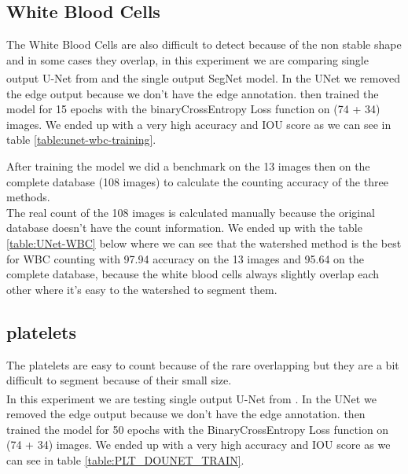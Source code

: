 \subsection{White Blood Cells}
\hspace{\parindent}
The White Blood Cells are also difficult to detect because of the non stable shape and in some cases they overlap, in this experiment we are comparing single output U-Net from \textsuperscript{\cite{10.1007/978-3-030-44584-3_31}} and the single output SegNet model.
In the UNet we removed the edge output because we don't have the edge annotation. then trained the model for 15 epochs with the binaryCrossEntropy Loss function on (74 + 34) images. 
We ended up with a very high accuracy and IOU score as we can see in table \ref{table:unet-wbc-training}.



After training the model we did a benchmark on the 13 images then on the complete database (108 images) to calculate the counting accuracy of the three methods.\\ 
The real count of the 108 images is calculated manually because the original database doesn't have the count information. We ended up with the table \ref{table:UNet-WBC} below where we can see that the watershed method is the best for WBC counting with 97.94 accuracy on the 13 images and 95.64 on the complete database, because the white blood cells always slightly overlap each other where it's easy to the watershed to segment them.



\subsection{platelets}
\hspace{\parindent}
The platelets are easy to count because of the rare overlapping but they are a bit difficult to segment because of their small size.\\
In this experiment we are testing single output U-Net from \textsuperscript{\cite{10.1007/978-3-030-44584-3_31}}. In the UNet we removed the edge output because we don’t have the edge annotation.
then trained the model for 50 epochs with the BinaryCrossEntropy Loss function on (74 + 34) images.
We ended up with a very high accuracy and IOU score as we can see in table \ref{table:PLT_DOUNET_TRAIN}.



